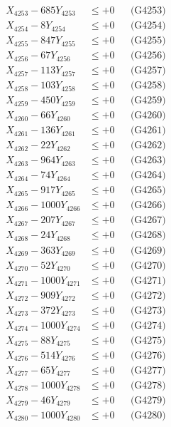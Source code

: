 \documentclass[a4paper,10pt]{article}
\begin{document}
{\begin{align}
X_{4253} - 685Y_{4253} &\leq +0 && \text{(G4253)} \\
X_{4254} - 8Y_{4254} &\leq +0 && \text{(G4254)} \\
X_{4255} - 847Y_{4255} &\leq +0 && \text{(G4255)} \\
X_{4256} - 67Y_{4256} &\leq +0 && \text{(G4256)} \\
X_{4257} - 113Y_{4257} &\leq +0 && \text{(G4257)} \\
X_{4258} - 103Y_{4258} &\leq +0 && \text{(G4258)} \\
X_{4259} - 450Y_{4259} &\leq +0 && \text{(G4259)} \\
X_{4260} - 66Y_{4260} &\leq +0 && \text{(G4260)} \\
\allowbreak
X_{4261} - 136Y_{4261} &\leq +0 && \text{(G4261)} \\
X_{4262} - 22Y_{4262} &\leq +0 && \text{(G4262)} \\
X_{4263} - 964Y_{4263} &\leq +0 && \text{(G4263)} \\
X_{4264} - 74Y_{4264} &\leq +0 && \text{(G4264)} \\
X_{4265} - 917Y_{4265} &\leq +0 && \text{(G4265)} \\
X_{4266} - 1000Y_{4266} &\leq +0 && \text{(G4266)} \\
X_{4267} - 207Y_{4267} &\leq +0 && \text{(G4267)} \\
X_{4268} - 24Y_{4268} &\leq +0 && \text{(G4268)} \\
X_{4269} - 363Y_{4269} &\leq +0 && \text{(G4269)} \\
X_{4270} - 52Y_{4270} &\leq +0 && \text{(G4270)} \\
\allowbreak
X_{4271} - 1000Y_{4271} &\leq +0 && \text{(G4271)} \\
X_{4272} - 909Y_{4272} &\leq +0 && \text{(G4272)} \\
X_{4273} - 372Y_{4273} &\leq +0 && \text{(G4273)} \\
X_{4274} - 1000Y_{4274} &\leq +0 && \text{(G4274)} \\
X_{4275} - 88Y_{4275} &\leq +0 && \text{(G4275)} \\
X_{4276} - 514Y_{4276} &\leq +0 && \text{(G4276)} \\
X_{4277} - 65Y_{4277} &\leq +0 && \text{(G4277)} \\
X_{4278} - 1000Y_{4278} &\leq +0 && \text{(G4278)} \\
X_{4279} - 46Y_{4279} &\leq +0 && \text{(G4279)} \\
X_{4280} - 1000Y_{4280} &\leq +0 && \text{(G4280)} \\

\end{align}}
\end{document}
